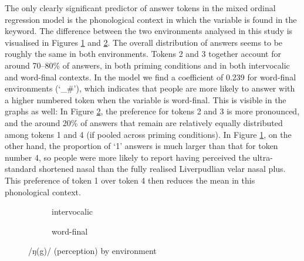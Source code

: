 The only clearly significant predictor of answer tokens in the mixed ordinal regression model is the phonological context in which the variable is found in the keyword.
The difference between the two environments analysed in this study is visualised in Figures \ref{fig.bar.ng.ext.intervoc} and \ref{fig.bar.ng.ext.wordfinal}.
The overall distribution of answers seems to be roughly the same in both environments.
Tokens 2 and 3 together account for around 70--80\% of answers, in both priming conditions and in both intervocalic and word-final contexts.
In the model we find a coefficient of 0.239 for word-final environments (`\_\#'), which indicates that people are more likely to answer with a higher numbered token when the variable is word-final.
This is visible in the graphs as well: In Figure \ref{fig.bar.ng.ext.wordfinal}, the preference for tokens 2 and 3 is more pronounced, and the around 20\% of answers that remain are relatively equally distributed among tokens 1 and 4 (if pooled across priming conditions).
In Figure \ref{fig.bar.ng.ext.intervoc}, on the other hand, the proportion of `1' answers is much larger than that for token number 4, so people were more likely to report having perceived the ultra-standard shortened nasal than the fully realised Liverpudlian velar nasal plus.
This preference of token 1 over token 4 then reduces the mean in this phonological context.

\begin{figure}[h]
	\centering
	\begin{subfigure}{0.49\textwidth}
		\centering
			\resizebox{\linewidth}{!}{}
		\caption{intervocalic}
		\label{fig.bar.ng.ext.intervoc}
	\end{subfigure}
	\begin{subfigure}{0.49\textwidth}
		\centering
			\resizebox{\linewidth}{!}{} 
		\caption{word-final}
		\label{fig.bar.ng.ext.wordfinal}
	\end{subfigure}
	\caption{/ŋ(g)/ (perception) by environment}
	\label{fig.bar.ng.ext.environment}
\end{figure}


